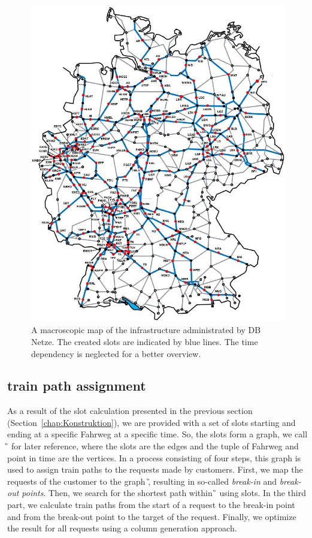 %
\begin{figure}[tb]
	\centering
	\includegraphics[scale=0.40]{Bilder/STA-Karte.jpg}
	\caption{A macroscopic map of the infrastructure administrated by DB Netze. The created slots are indicated by blue lines. The time dependency is neglected for a better overview.}
	\label{fig:STAKarte}
\end{figure}


\subsection{train path assignment}
\label{chap:Belegung}
%
As a result of the slot calculation presented in the previous section (Section~\ref{chap:Konstruktion}), we are provided with a set of slots starting and ending at a specific Fahrweg at a specific time. So, the slots form a graph, we call \G\, for later reference, where the slots are the edges and the tuple of Fahrweg and point in time are the vertices. In a process consisting of four steps, this graph is used to assign train paths to the requests made by customers. First, we map the requests of the customer to the graph \G, resulting in so-called \emph{break-in} and \emph{break-out points}. Then, we search for the shortest path within \G\, using slots. In the third part, we calculate train paths from the start of a request to the break-in point and from the break-out point to the target of the request. Finally, we optimize the result for all requests using a column generation approach.


